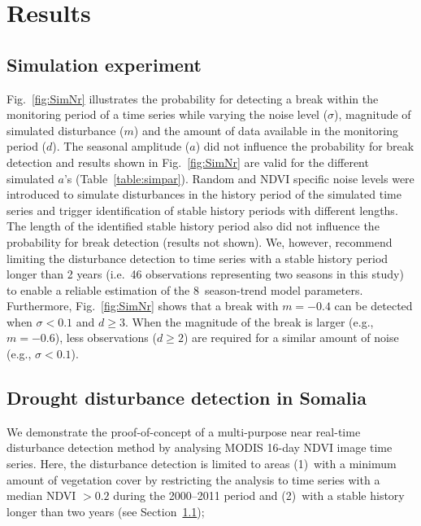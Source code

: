 \documentclass[authoryear,preprint,review,10pt]{elsarticle}
\begin{document}
\section{Results}

\subsection{Simulation experiment} \label{sec:DiscSim}

Fig.~\ref{fig:SimNr} illustrates the probability for detecting a break within the monitoring period of a time series while varying the noise level ($\sigma$), magnitude of simulated disturbance ($m$) and the amount of data available in the monitoring period ($d$). The seasonal amplitude ($a$) did not influence the probability for break detection and results shown in Fig.~\ref{fig:SimNr}  are valid for the different simulated $a$'s (Table~\ref{table:simpar}). 
Random and NDVI specific noise levels were introduced to simulate disturbances in the history period of the simulated time series and trigger identification of stable history periods with different lengths. The length of the identified stable history period also did not influence the probability for break detection (results not shown). We, however, recommend limiting the disturbance detection to time series with a stable history period longer than 2 years (i.e.\ 46 observations representing two seasons in this study) to enable a reliable estimation of the 8~season-trend model parameters. Furthermore, Fig.~\ref{fig:SimNr} shows that a break with $m = -0.4$ can be detected when $\sigma < 0.1$ and $d  \geq 3$.  When the magnitude of
the break is larger (e.g., $m = -0.6$), less observations ($d \geq 2$) are required for a similar amount of noise (e.g., $\sigma < 0.1$). 

\subsection{Drought disturbance detection in Somalia} \label{sec:DiscReal}

We demonstrate the proof-of-concept of a multi-purpose near real-time disturbance detection method by analysing MODIS 16-day NDVI image time series. Here, the disturbance detection is limited to areas (1)~with a minimum amount of vegetation cover by restricting the analysis to time series with a median NDVI $>0.2$ during the 2000--2011 period \citep{Vrieling:2011da} and (2)~with a stable history longer than two years (see Section~\ref{sec:DiscSim});
\end{document}

